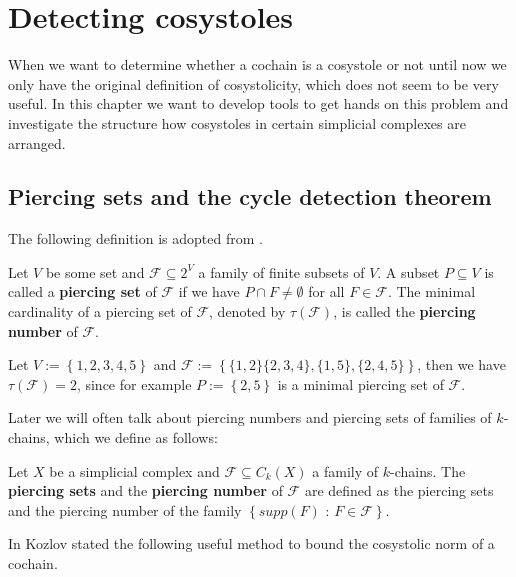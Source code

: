 
\chapter{Detecting cosystoles}

\label{Chapter2}

When we want to determine whether a cochain is a cosystole or not until now we only have the original definition of cosystolicity, which does not seem to be very useful. In this chapter we want to develop tools to get hands on this problem and investigate the structure how cosystoles in certain simplicial complexes are arranged.

\section{Piercing sets and the cycle detection theorem}

The following definition is adopted from \cite{6}.

\begin{defi}
Let \(V\) be some set and \(\mathcal{F}\subseteq 2^V\) a family of finite subsets of \(V\). A subset \(P\subseteq V\) is called a \textbf{piercing set} of \(\mathcal{F}\) if we have \(P\cap F\neq\emptyset\) for all \(F\in\mathcal{F}\). The minimal cardinality of a piercing set of \(\mathcal{F}\), denoted by \(\tau(\mathcal{F})\), is called the \textbf{piercing number} of \(\mathcal{F}\).
\end{defi}

\begin{expl}
Let \(V:=\left\{1,2,3,4,5\right\}\) and \(\mathcal{F}:=\left\{\{1,2\}\{2,3,4\},\{1,5\},\{2,4,5\}\right\}\), then we have \(\tau(\mathcal{F})=2\), since for example \(P:=\left\{2,5\right\}\) is a minimal piercing set of \(\mathcal{F}\).
\end{expl}

Later we will often talk about piercing numbers and piercing sets of families of \(k\)-chains, which we define as follows:

\begin{defi}
Let \(X\) be a simplicial complex and \(\mathcal{F}\subseteq C_k(X)\) a family of \(k\)-chains. The \textbf{piercing sets} and the \textbf{piercing number} of \(\mathcal{F}\) are defined as the piercing sets and the piercing number of the family \(\left\{supp(F)\text{ : }F\in\mathcal{F}\right\}\).
\end{defi}

In \cite{6} Kozlov stated the following useful method to bound the cosystolic norm of a cochain.

